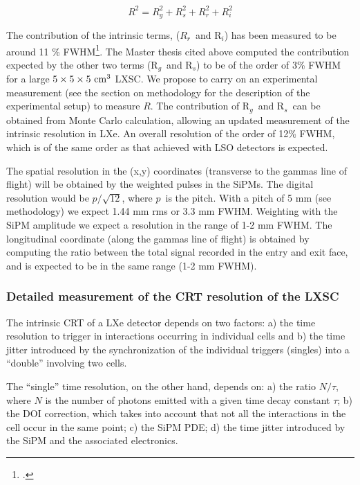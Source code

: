 \begin{equation}
R^2 = R_g^2 + R_s^2 + R_r^2 + R_i^2
\end{equation}

The contribution of the intrinsic terms, ($R_r$~and R$_i$) has been measured to be
around 11 \% FWHM\footcite{aprileRes}. The Master thesis cited above computed the contribution expected by the other two terms (R$_g$~and R$_s$) to be of the order of 3\% FWHM for a large
$5 \times 5 \times 5 {\rm ~cm^3}$ LXSC. We propose to carry on an experimental measurement (see the section on methodology for the description of the experimental setup) to measure $R$. The contribution of R$_g$~and R$_s$~can be obtained from Monte Carlo calculation, allowing an updated measurement of the intrinsic resolution in LXe. An overall resolution of the order of 12\% FWHM, which is of the same order as that achieved with LSO detectors is expected. 

The spatial resolution in the (x,y) coordinates (transverse to the gammas line of flight) will be obtained by the weighted pulses in the SiPMs. The digital resolution would be
$p/\sqrt{12}$, where $p$~is the pitch. With a pitch of 5 mm (see methodology) we expect 1.44 mm rms or 3.3 mm FWHM. Weighting with the SiPM amplitude we expect a resolution in the range of 1-2 mm FWHM. The longitudinal coordinate (along the gammas line of flight) is obtained by computing the ratio between the
total signal recorded in the entry and exit face, and is expected to be in the same range (1-2 mm FWHM).    

\subsubsection*{Detailed measurement of the  CRT resolution of the LXSC}

The intrinsic CRT of a LXe detector depends on two factors: a) the time resolution to trigger in interactions occurring in individual cells and b) the time jitter introduced by the synchronization of the individual triggers (singles) into a ``double'' involving two cells. 

The ``single'' time resolution, on the other hand, depends on: a) the ratio $N/\tau$, where $N$ is the number of photons emitted with a given time decay constant $\tau$; b) the DOI correction, which takes into account that not all the interactions in the cell occur in the same point; c) the SiPM PDE; d) the time jitter introduced by the SiPM and the associated electronics. 

